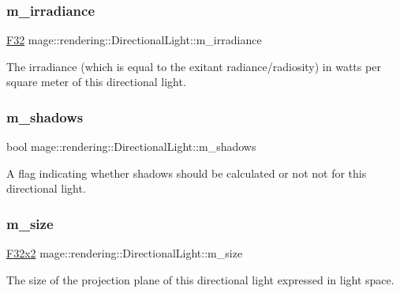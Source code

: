 \subsubsection{\texorpdfstring{m\+\_\+irradiance}{m\_irradiance}}
{\footnotesize\ttfamily \mbox{\hyperlink{namespacemage_aa97e833b45f06d60a0a9c4fc22ae02c0}{F32}} mage\+::rendering\+::\+Directional\+Light\+::m\+\_\+irradiance\hspace{0.3cm}{\ttfamily [private]}}

The irradiance (which is equal to the exitant radiance/radiosity) in watts per square meter of this directional light. \mbox{\label{classmage_1_1rendering_1_1_directional_light_a64fa40ef9f9d0ae8a0856aabd44f0cae}} 
\subsubsection{\texorpdfstring{m\+\_\+shadows}{m\_shadows}}
{\footnotesize\ttfamily bool mage\+::rendering\+::\+Directional\+Light\+::m\+\_\+shadows\hspace{0.3cm}{\ttfamily [private]}}

A flag indicating whether shadows should be calculated or not not for this directional light. \mbox{\label{classmage_1_1rendering_1_1_directional_light_ad983ca7abf8cf1f542fd68b4dfbf2ba2}} 
\subsubsection{\texorpdfstring{m\+\_\+size}{m\_size}}
{\footnotesize\ttfamily \mbox{\hyperlink{namespacemage_a9dc0d34d6ecc87e4cfa4a826102117bc}{F32x2}} mage\+::rendering\+::\+Directional\+Light\+::m\+\_\+size\hspace{0.3cm}{\ttfamily [private]}}

The size of the projection plane of this directional light expressed in light space. 